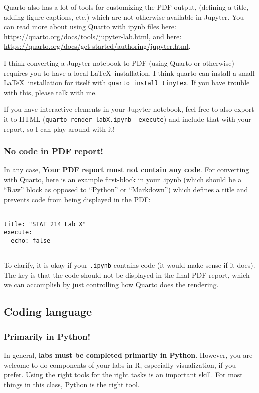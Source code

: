 \documentclass[letterpaper,12pt]{article}
\begin{document}
Quarto also has a lot of tools for customizing the PDF output, (defining a title, adding figure captions, etc.) which are not otherwise available in Jupyter. You can read more about using Quarto with ipynb files here: \url{https://quarto.org/docs/tools/jupyter-lab.html}, and here: \url{https://quarto.org/docs/get-started/authoring/jupyter.html}.

I think converting a Jupyter notebook to PDF (using Quarto or otherwise) requires you to have a local \LaTeX\ installation. I think quarto can install a small \LaTeX\ installation for itself with \texttt{quarto install tinytex}. If you have trouble with this, please talk with me.

If you have interactive elements in your Jupyter notebook, feel free to also export it to HTML (\texttt{quarto render labX.ipynb --execute}) and include that with your report, so I can play around with it!


\subsubsection{No code in PDF report!}
In any case, \textbf{Your PDF report must not contain any code}. For converting with Quarto, here is an example first-block in your .ipynb (which should be a ``Raw'' block as opposed to ``Python'' or ``Markdown'') which defines a title and prevents code from being displayed in the PDF:
\begin{verbatim}
---
title: "STAT 214 Lab X"
execute:
  echo: false
---
\end{verbatim}
To clarify, it is okay if your \texttt{.ipynb} contains code (it would make sense if it does). The key is that the code should not be displayed in the final PDF report, which we can accomplish by just controlling how Quarto does the rendering.

\subsection{Coding language}
\subsubsection{Primarily in Python!}
In general, \textbf{labs must be completed primarily in Python}. However, you are welcome to do components of your labs in R, especially visualization, if you prefer. Using the right tools for the right tasks is an important skill. For most things in this class, Python is the right tool.
\end{document}
